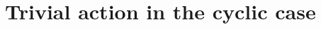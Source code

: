 \begin{comment}
In order to compute this we first need to work out what $r_{\bar Q}$ and $s_{\bar Q}$ are.
Denoting the ramification divisor of $\pi$ by $R$, recall that we can write $mK_X = m \pi^* K_Y + mR$.
Since we are assuming that $g_Y=0$, we can write $K_Y=-2[Q']$ for some unramified point $Q'\in Y$.
Also, we know that $R=\sum_{P\ {\rm ramified}} (e_P^t-1)[P]$.
Clearly if $Q$ is not ramified and not $Q'$, then $r_{\bar Q}=s_{\bar Q}=0$.
If $\bar Q \in \pi^{-1}(Q')$ then $-2m = r_{\bar Q} + s_{\bar Q}$.
Finally, if $P$ is a ramified point then 
\begin{equation}\label{remainder}
m(e_P^t-1)=r_P + s_Pe^t_P.
\end{equation}



We now show that the new formula for the fixed space matches that from \ref{dim}, \ie, we check that
\[
1 + \sum_{Q\in Y} s_{\bar Q} = (2m-1)(g_Y-1) + \deg\left\lfloor\frac{m\pi_*(R)}{n}\right\rfloor
\]
under the conditions we have imposed.

First note that since $g_Y = 0$ we can simplify the right hand side to 
\[
1 - 2m + \deg\left\lfloor\frac{m\pi_*(R)}{n}\right\rfloor,
\]
so all we have to show is that
\[
\sum_{Q\in Y} s_{\bar Q} =\deg\left\lfloor\frac{m\pi_*(R)}{n}\right\rfloor - 2m.
\]

Suppose $\bar Q \in \pi^{-1} (Q')$.
Then since we assumed that $Q'$ is not a branch point (\ie $e^t_{\bar Q} = 1$), and since $r_{\bar Q}\in \{0,\ldots, e^t_{\bar Q}-1\}$, we see that $r_{\bar Q} = 0$.
Hence $s_{\bar Q} = 0$.

On the other hand, if $Q$ is a branch point, we denote by $l_{\bar Q}$ the number of points mapping to $Q$, \ie $l_{\bar Q} = \frac{n}{e_{\bar Q}}$.
Then we can multiply \eqref{remainder} by $l_{\bar Q}$, and then re-arranging giving us
\[
s_{\bar Q} = \frac{l_{\bar Q}(m(e^t_{\bar Q}-1)-r_{\bar Q})}{n}.
\]
Since $r_{\bar Q} \leq e_{\bar Q}^t - 1 < e_{\bar Q}$ it follows that $r_{\bar Q} < l_{\bar Q}e^t_{\bar Q} = n$.
Hence $s_{\bar Q}$ must be the integer part of $\frac{m l_{\bar Q} (e_{\bar Q}^t-1)}{n}$, which is precisely the coefficient of $[Q]$ in  $\left\lfloor \frac{m\pi_*(R)}{n} \right\rfloor$.
So by comparing coefficients we see that the two formulas are equivalent.
\end{comment}
\newpage



\section{Trivial action in the cyclic case}


